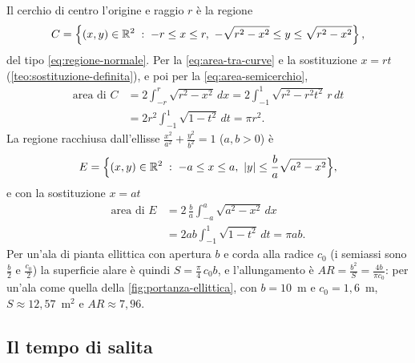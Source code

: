 \begin{esempio}\label{es:cerchio-ellisse}
Il cerchio di centro l'origine e raggio $r$ è la regione
\[
  C=\left\{ (x,y)\in\mathbb{R}^{2} \;:\; -r\le x\le r,\ -\sqrt{r^{2}-x^{2}}\le y\le\sqrt{r^{2}-x^{2}} \right\} ,
\]
del tipo \eqref{eq:regione-normale}. Per la \eqref{eq:area-tra-curve} e la sostituzione $x=rt$
(\cref{teo:sostituzione-definita}), e poi per la \eqref{eq:area-semicerchio},
\begin{equation}\label{eq:area-cerchio-integrale}
\begin{split}
  \text{area di }C&=2\int_{-r}^{r}\sqrt{r^{2}-x^{2}}\,dx
  =2\int_{-1}^{1}\sqrt{r^{2}-r^{2}t^{2}}\,r\,dt\\
  &=2r^{2}\int_{-1}^{1}\sqrt{1-t^{2}}\,dt=\pi r^{2} .
\end{split}
\end{equation}
La regione racchiusa dall'ellisse $\frac{x^{2}}{a^{2}}+\frac{y^{2}}{b^{2}}=1$ ($a,b>0$) è
\[
  E=\Bigl\{(x,y)\in\mathbb{R}^{2} \;:\; -a\le x\le a,\ \lvert y\rvert\le\frac ba\sqrt{a^{2}-x^{2}}\Bigr\} ,
\]
e con la sostituzione $x=at$
\begin{equation}\label{eq:area-ellisse}
\begin{split}
  \text{area di }E&=2\,\frac ba\int_{-a}^{a}\sqrt{a^{2}-x^{2}}\,dx\\
  &=2ab\int_{-1}^{1}\sqrt{1-t^{2}}\,dt=\pi ab .
\end{split}
\end{equation}
Per un'ala di pianta ellittica con apertura $b$ e corda alla radice $c_{0}$ (i semiassi
sono $\frac b2$ e $\frac{c_{0}}2$) la superficie alare è quindi $S=\frac\pi4\,c_{0}b$, e
l'allungamento è $AR=\frac{b^{2}}S=\frac{4b}{\pi c_{0}}$: per un'ala come quella della
\cref{fig:portanza-ellittica}, con $b=10$~m e $c_{0}=1{,}6$~m, $S\approx12{,}57$~m$^{2}$ e
$AR\approx7{,}96$.
\end{esempio}

\subsection{Il tempo di salita}


